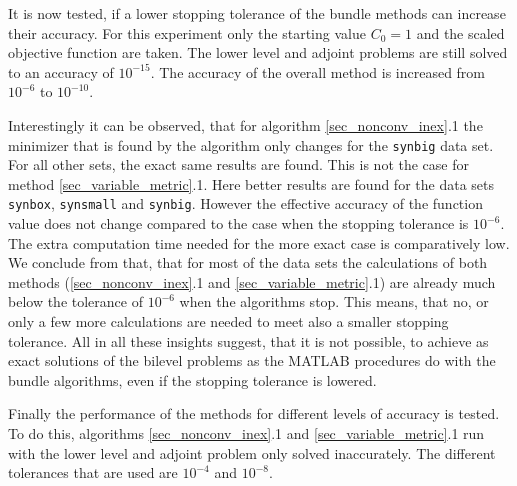 It is now tested, if a lower stopping tolerance of the bundle methods can increase their accuracy.
For this experiment only the starting value \(C_0 = 1\) and the scaled objective function are taken.
The lower level and adjoint problems are still solved to an accuracy of \(10^{-15}\). The accuracy of the overall method is increased from \(10^{-6}\) to \(10^{-10}\).

Interestingly it can be observed, that for algorithm \ref{sec_nonconv_inex}.1 the minimizer that is found by the algorithm only changes for the \texttt{synbig} data set. For all other sets, the exact same results are found.
This is not the case for method \ref{sec_variable_metric}.1. Here better results are found for the data sets \texttt{synbox}, \texttt{synsmall} and \texttt{synbig}.
However the effective accuracy of the function value does not change compared to the case when the stopping tolerance is \(10^{-6}\). The extra computation time needed for the more exact case is comparatively low.
We conclude from that, that for most of the data sets the calculations of both methods (\ref{sec_nonconv_inex}.1 and \ref{sec_variable_metric}.1) are already much below the tolerance of \(10^{-6}\) when the algorithms stop. This means, that no, or only a few more calculations are  needed to meet also a smaller stopping tolerance.
All in all these insights suggest, that it is not possible, to achieve as exact solutions of the bilevel problems as the MATLAB procedures do with the bundle algorithms, even if the stopping tolerance is lowered.

Finally the performance of the methods for different levels of accuracy is tested.
To do this, algorithms \ref{sec_nonconv_inex}.1 and \ref{sec_variable_metric}.1 run with the lower level and adjoint problem only solved inaccurately.
The different tolerances that are used are \(10^{-4}\) and \(10^{-8}\).  

